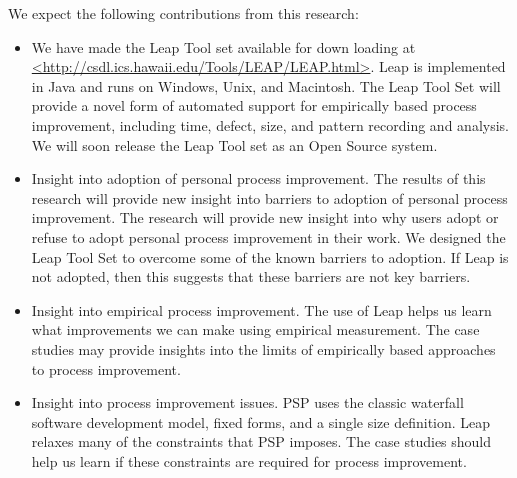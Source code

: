 \documentclass[12pt]{article}
\begin{document}
We expect the following contributions from this research:
\begin{itemize}
\item{We have made the Leap Tool set available for down loading at
    \url{<http://csdl.ics.hawaii.edu/Tools/LEAP/LEAP.html>}.  Leap is
    implemented in Java and runs on Windows, Unix, and Macintosh.  The Leap
    Tool Set will provide a novel form of automated support for empirically
    based process improvement, including time, defect, size, and pattern
    recording and analysis.  We will soon release the Leap Tool set as an
    Open Source system.}
  
\item{Insight into adoption of personal process improvement.  The results
    of this research will provide new insight into barriers to adoption of
    personal process improvement.  The research will provide new insight
    into why users adopt or refuse to adopt personal process improvement in
    their work.  We designed the Leap Tool Set to overcome some of the
    known barriers to adoption.  If Leap is not adopted, then this suggests
    that these barriers are not key barriers.}
  
\item{Insight into empirical process improvement.  The use of Leap helps us
    learn what improvements we can make using empirical measurement.  The
    case studies may provide insights into the limits of empirically based
    approaches to process improvement.}
  
\item{Insight into process improvement issues.  PSP uses the classic
    waterfall software development model, fixed forms, and a single size
    definition. Leap relaxes many of the constraints that PSP imposes.  The
    case studies should help us learn if these constraints are required for
    process improvement. }

\end{itemize}



\end{document}
